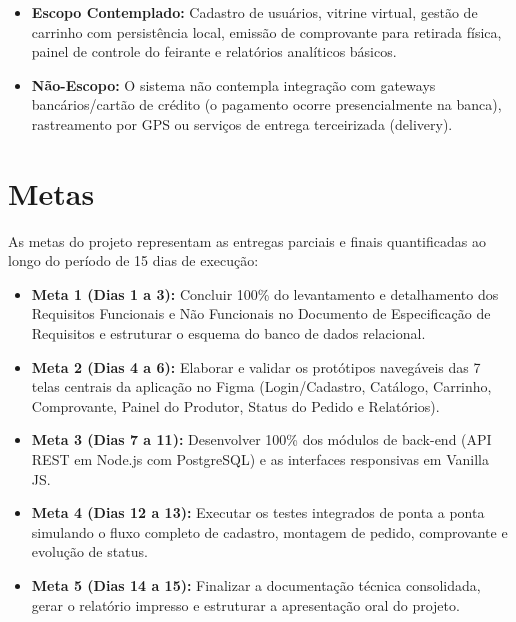 \documentclass[12pt,a4paper]{article}
\begin{document}
\begin{itemize}[leftmargin=1.5cm]

    \item \textbf{Escopo Contemplado:} Cadastro de usuários, vitrine virtual, gestão de carrinho com persistência local, emissão de comprovante para retirada física, painel de controle do feirante e relatórios analíticos básicos.

    \item \textbf{Não-Escopo:} O sistema não contempla integração com gateways bancários/cartão de crédito (o pagamento ocorre presencialmente na banca), rastreamento por GPS ou serviços de entrega terceirizada (delivery).

\end{itemize}

\newpage


\section{Metas}

As metas do projeto representam as entregas parciais e finais quantificadas ao longo do período de 15 dias de execução:

\begin{itemize}[leftmargin=1.5cm]

    \item \textbf{Meta 1 (Dias 1 a 3):} Concluir 100\% do levantamento e detalhamento dos Requisitos Funcionais e Não Funcionais no Documento de Especificação de Requisitos e estruturar o esquema do banco de dados relacional.

    \item \textbf{Meta 2 (Dias 4 a 6):} Elaborar e validar os protótipos navegáveis das 7 telas centrais da aplicação no Figma (Login/Cadastro, Catálogo, Carrinho, Comprovante, Painel do Produtor, Status do Pedido e Relatórios).

    \item \textbf{Meta 3 (Dias 7 a 11):} Desenvolver 100\% dos módulos de back-end (API REST em Node.js com PostgreSQL) e as interfaces responsivas em Vanilla JS.

    \item \textbf{Meta 4 (Dias 12 a 13):} Executar os testes integrados de ponta a ponta simulando o fluxo completo de cadastro, montagem de pedido, comprovante e evolução de status.

    \item \textbf{Meta 5 (Dias 14 a 15):} Finalizar a documentação técnica consolidada, gerar o relatório impresso e estruturar a apresentação oral do projeto.

\end{itemize}
\end{document}
